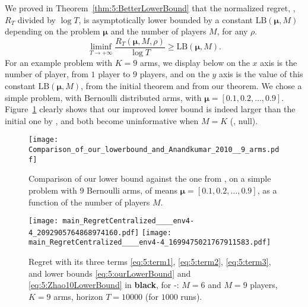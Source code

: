 
We proved in Theorem~\ref{thm:5:BetterLowerBound} that the normalized regret, \ie, $R_T$ divided by
$\log T$, is asymptotically lower bounded by a constant $\mathrm{LB}(\boldsymbol{\mu}, M)$
depending on the problem $\boldsymbol{\mu}$ and the number of players $M$, for any $\rho$.
\begin{equation}
  \mathop{\lim\inf}\limits_{T \to +\infty} \frac{R_T(\boldsymbol{\mu}, M, \rho)}{\log T} \geq \mathrm{LB}(\boldsymbol{\mu}, M).
\end{equation}
%
For an example problem with $K = 9$ arms, we display below on the $x$ axis is
the number of player, from $1$ player to $9$ players, and on the
$y$ axis is the value of this constant $\mathrm{LB}(\boldsymbol{\mu}, M)$, from the initial
theorem and from our theorem.
We chose a simple problem, with Bernoulli
distributed arms, with $\boldsymbol{\mu} = [0.1, 0.2, \dots, 0.9]$.
%
Figure~\ref{fig:5:CompLowerBounds} clearly shows that our improved lower bound is indeed larger than the initial one by \cite{Zhao10},
and both become uninformative when $M=K$ (\ie, null).

\begin{figure}[h!]
  \centering
  \texttt{[image: Comparison\_of\_our\_lowerbound\_and\_Anandkumar\_2010\_\_9\_arms.pdf]}
  \caption[Comparison of our lower bound against the one from \cite{Zhao10}]{Comparison of our lower bound against the one from \cite{Zhao10}, on a simple problem with $9$ Bernoulli arms, of means $\boldsymbol{\mu} = [0.1, 0.2, \dots, 0.9]$, as a function of the number of players $M$.}
  \label{fig:5:CompLowerBounds}
\end{figure}


%
%
\begin{figure}[!h]
    \centering
        \texttt{[image: main\_RegretCentralized\_\_\_\_env4-4\_2092905764868974160.pdf]}
        \texttt{[image: main\_RegretCentralized\_\_\_\_env4-4\_1699475021767911583.pdf]}
    \caption[Multi-player regret with its three terms]{Regret with its three terms \ref{eq:5:term1}, \ref{eq:5:term2}, \ref{eq:5:term3}, and lower bounds \eqref{eq:5:ourLowerBound} and \eqref{eq:5:Zhao10LowerBound} in \textbf{black}, for \Selfish-\klUCB: $M=6$ and $M=9$ players, $K=9$ arms, horizon $T=10000$ (for $1000$ runs).}
    \label{fig:5:MP__M9_K9_T10000_N1000__9_algos__main_RegretCentralized____env6}
\end{figure}



